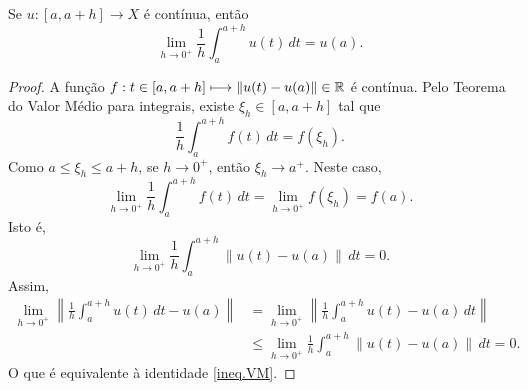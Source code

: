 \begin{proposition}\label{Prop.VM}
Se $u:[a,a+h]\longrightarrow X$ é {contínua}, então
\begin{equation}\label{ineq.VM}
\lim\limits_{h\to 0^+} \frac{1}{h}\int_a^{a+h} u(t)\,dt = u(a).
\end{equation}
\end{proposition}
\begin{proof}
A função  $f:t\in [a,a+h]\longmapsto \|u(t)-u(a)\|\in \mathbb{R}$ é contínua. Pelo Teorema do Valor Médio para integrais, existe $\xi_h\in [a,a+h]$ tal que 
\[
\frac{1}{h}\int_a^{a+h} f(t)\,dt=f(\xi_h).
\]
Como $a\leq \xi_h\leq a+h$, se $h\to 0^+$, então $\xi_h\to a^+$. Neste caso, 
\[
\lim_{h\to 0^+}\frac{1}{h}\int_a^{a+h} f(t)\,dt=\lim_{h\to 0^+}f(\xi_h)=f(a).
\]
Isto é, 
\begin{equation*}
\lim_{h\to 0^+}\frac{1}{h}\int_a^{a+h} \|u(t)-u(a)\|\,dt=0.
\end{equation*}
Assim, 
\begin{align*}
\lim_{h\to 0^+}\left\|\frac{1}{h}\int_a^{a+h} u(t)\,dt -u(a)\right\|& =
\lim_{h\to 0^+}\left\|\frac{1}{h}\int_a^{a+h} u(t)-u(a)\,dt\right\|\\
&\leq \lim_{h\to 0^+}\frac{1}{h}\int_a^{a+h}\left\| u(t)-u(a)\right\|\,dt
=0.
\end{align*}
O que é equivalente à identidade \eqref{ineq.VM}.
\end{proof}